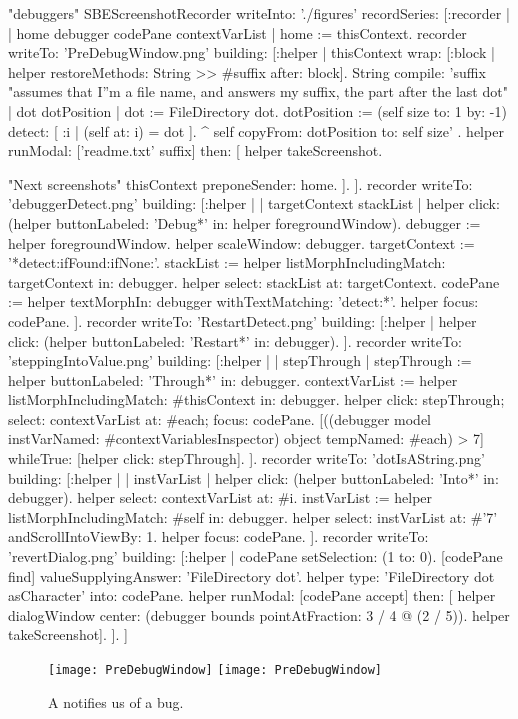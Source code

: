 \documentclass[a4paper,10pt,twoside]{book}
\begin{document}
\begin{ExecuteSmalltalkScript}
"debuggers"
SBEScreenshotRecorder writeInto: './figures' recordSeries: [:recorder |
	| home debugger codePane contextVarList |
	home := thisContext.
	recorder writeTo: 'PreDebugWindow.png' building: [:helper |
		thisContext wrap: [:block | helper restoreMethods: {String >> #suffix} after: block].
		String compile: 'suffix
	"assumes that I''m a file name, and answers my suffix, the part after the last dot"
	| dot dotPosition |
	dot := FileDirectory dot.
	dotPosition := (self size to: 1 by: -1) detect: [ :i | (self at: i) = dot ].
	^ self copyFrom: dotPosition to: self size'
.
		helper
			runModal: ['readme.txt' suffix]
			then: [
				helper takeScreenshot.
				
				"Next screenshots"
				thisContext preponeSender: home.
			].
	].
	recorder writeTo: 'debuggerDetect.png' building: [:helper |
		| targetContext stackList |
		helper click: (helper buttonLabeled: 'Debug*' in: helper foregroundWindow).
		debugger := helper foregroundWindow.
		helper scaleWindow: debugger.
		targetContext := '*detect:ifFound:ifNone:'.
		stackList := helper listMorphIncludingMatch: targetContext in: debugger.
		helper select: stackList at: targetContext.
		codePane := helper textMorphIn: debugger withTextMatching: 'detect:*'.
		helper focus: codePane.
	].
	recorder writeTo: 'RestartDetect.png' building: [:helper |
		helper click: (helper buttonLabeled: 'Restart*' in: debugger).
	].
	recorder writeTo: 'steppingIntoValue.png' building: [:helper |
		| stepThrough |
		stepThrough := helper buttonLabeled: 'Through*' in: debugger.
		contextVarList := helper listMorphIncludingMatch: #thisContext in: debugger.
		helper
			click: stepThrough;
			select: contextVarList at: #each;
			focus: codePane.
		[((debugger model instVarNamed: #contextVariablesInspector) object tempNamed: #each) > 7]
			whileTrue: [helper click: stepThrough].
	].
	recorder writeTo: 'dotIsAString.png' building: [:helper |
		| instVarList |
		helper click: (helper buttonLabeled: 'Into*' in: debugger).
		helper select: contextVarList at: #i.
		instVarList := helper listMorphIncludingMatch: #self in: debugger.
		helper select: instVarList at: #'7' andScrollIntoViewBy: 1.
		helper focus: codePane.
	].
	recorder writeTo: 'revertDialog.png' building: [:helper |
		codePane setSelection: (1 to: 0).
		[codePane find]
			valueSupplyingAnswer: 'FileDirectory dot'.
		helper type: 'FileDirectory dot asCharacter' into: codePane.
		helper
			runModal: [codePane accept]
			then: [
				helper dialogWindow center: (debugger bounds pointAtFraction: 3 / 4 @ (2 / 5)).
				helper takeScreenshot].
	].
]
\end{ExecuteSmalltalkScript}
\begin{figure}[btp]
	\begin{center}
	\ifluluelse
		{\texttt{[image: PreDebugWindow]}}
		{\texttt{[image: PreDebugWindow]}}
	\end{center}
	\caption{A  notifies us of a bug.}
	\label{fig:PreDebugWindow}
\end{figure}
\end{document}
